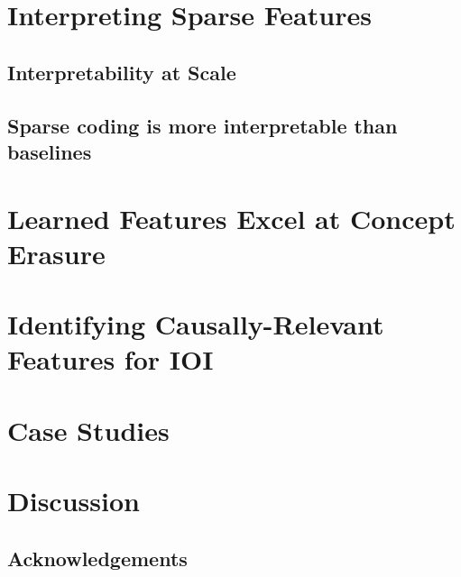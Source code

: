 \documentclass[12pt]{article}
\begin{document}
\section{Interpreting Sparse Features}
\label{section:autointerp}
\subsection{Interpretability at Scale}
\label{section:autointerp_background}


\subsection{Sparse coding is more interpretable than baselines}



\section{Learned Features Excel at Concept Erasure}

\label{section:concept_erasure}



\section{Identifying Causally-Relevant Features for IOI}



\section{Case Studies}

\label{section:case_studies}




\section{Discussion}


\subsection{Acknowledgements}




\newpage
\printbibliography
\end{document}
